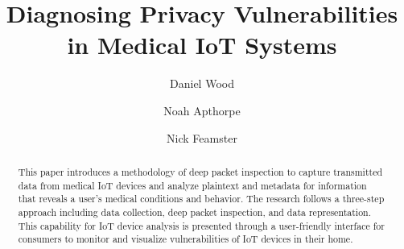 \documentclass[sigconf]{acmart}
\begin{document}
\title{Diagnosing Privacy Vulnerabilities in Medical IoT Systems} %
\author{Daniel Wood}
\author{Noah Apthorpe}
\author{Nick Feamster}

\renewcommand{\shortauthors}{D. Wood et al.}


\begin{abstract}
This paper introduces a methodology of deep packet inspection to capture transmitted data from medical IoT devices and analyze plaintext and metadata for information that reveals a user's medical conditions and behavior. The research follows a three-step approach including data collection, deep packet inspection, and data representation. This capability for IoT device analysis is presented through a user-friendly interface for consumers to monitor and visualize vulnerabilities of IoT devices in their home.
\end{abstract}


\maketitle




\end{document}
